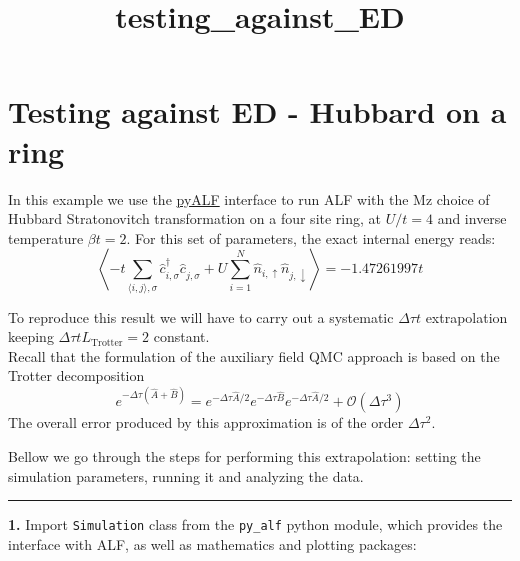 \documentclass[11pt]{article}
\title{testing\_against\_ED}
\begin{document}
    
    \maketitle
    
    

    
    \hypertarget{testing-against-ed---hubbard-on-a-ring}{%
\section{Testing against ED - Hubbard on a
ring}\label{testing-against-ed---hubbard-on-a-ring}}

    In this example we use the
\href{https://git.physik.uni-wuerzburg.de/ALF/pyALF}{pyALF} interface to
run ALF with the Mz choice of Hubbard Stratonovitch transformation on a
four site ring, at \(U/t=4\) and inverse temperature \(\beta t = 2\).
For this set of parameters, the exact internal energy reads:\\
\[
 \left\langle -t \sum_{\langle i,j\rangle, \sigma} \hat{c}_{i,\sigma}^{\dagger} \hat{c}_{j,\sigma}^{\phantom\dagger}   +  U  \sum_{i=1}^{N} \hat{n}_{i,\uparrow}\hat{n}_{j,\downarrow}  \right\rangle  =   -1.47261997 t 
\]

To reproduce this result we will have to carry out a systematic
\(\Delta \tau t\) extrapolation keeping
\(\Delta \tau t L_\text{Trotter} = 2\) constant.\\
Recall that the formulation of the auxiliary field QMC approach is based
on the Trotter decomposition \[
e^{ -\Delta \tau \left( \hat{A} + \hat{B} \right) }  =  e^{ -\Delta \tau \hat{A}/2}  e^{ -\Delta \tau  \hat{B}  }   e^{ -\Delta \tau \hat{A}/2}  +  \mathcal{O} \left (\Delta  \tau^3\right)
\] The overall error produced by this approximation is of the order
\(\Delta \tau^2\).

Bellow we go through the steps for performing this extrapolation:
setting the simulation parameters, running it and analyzing the data.

\begin{center}\rule{0.5\linewidth}{\linethickness}\end{center}

\textbf{1.} Import \texttt{Simulation} class from the \texttt{py\_alf}
python module, which provides the interface with ALF, as well as
mathematics and plotting packages:
\end{document}
